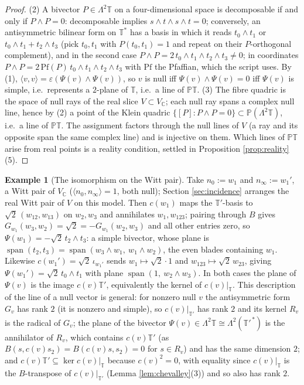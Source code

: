 \documentclass[11pt]{article}
\theoremstyle{definition}
\newtheorem{example}[theorem]{Example}
\newcommand{\C}{\mathbb{C}}
\newcommand{\T}{\mathbb{T}}
\newcommand{\PT}{\mathbb{PT}}
\newcommand{\nO}{n_0}
\newcommand{\nInf}{n_\infty}
\newcommand{\ip}[2]{\langle #1, #2\rangle}
\begin{document}
\begin{proof}
(2) A bivector $P \in \Lambda^2\T$ on a four-dimensional space is decomposable if and only if $P \wedge P = 0$: decomposable implies $s\wedge t\wedge s\wedge t = 0$; conversely, an antisymmetric bilinear form on $\T^*$ has a basis in which it reads $t_0\wedge t_1$ or $t_0\wedge t_1 + t_2\wedge t_3$ (pick $t_0, t_1$ with $P(t_0,t_1) = 1$ and repeat on their $P$-orthogonal complement), and in the second case $P\wedge P = 2\,t_0\wedge t_1\wedge t_2\wedge t_3 \neq 0$; in coordinates $P\wedge P = 2\,\mathrm{Pf}(P)\, t_0\wedge t_1\wedge t_2 \wedge t_3$ with $\mathrm{Pf}$ the Pfaffian, which the script uses. By (1), $\ip{v}{v} = \varepsilon(\Psi(v)\wedge\Psi(v))$, so $v$ is null iff $\Psi(v)\wedge\Psi(v) = 0$ iff $\Psi(v)$ is simple, i.e.\ represents a $2$-plane of $\T$, i.e.\ a line of $\PT$.
(3) The fibre quadric is the space of null rays of the real slice $V \subset V_\C$; each null ray spans a complex null line, hence by (2) a point of the Klein quadric $\{[P] : P\wedge P = 0\} \subset \mathbb{P}(\Lambda^2\T)$, i.e.\ a line of $\PT$. The assignment factors through the null lines of $V$ (a ray and its opposite span the same complex line) and is injective on them. Which lines of $\PT$ arise from real points is a reality condition, settled in Proposition \ref{prop:reality}(5).
\end{proof}

\begin{example}[The isomorphism on the Witt pair]\label{ex:psi}
Take $\nO := w_1$ and $\nInf := w_1'$, a Witt pair of $V_\C$ ($\ip{\nO}{\nInf} = 1$, both null); Section \ref{sec:incidence} arranges the real Witt pair of $V$ on this model. Then $c(w_1)$ maps the $\T'$-basis to $\sqrt2\,(w_{12}, w_{13})$ on $w_2, w_3$ and annihilates $w_1, w_{123}$; pairing through $B$ gives $G_{w_1}(w_3, w_2) = \sqrt2 = -G_{w_1}(w_2, w_3)$ and all other entries zero, so $\Psi(w_1) = -\sqrt2\,t_2\wedge t_3$: a simple bivector, whose plane is $\operatorname{span}(t_2, t_3) = \operatorname{span}(w_3\wedge w_1,\ w_1\wedge w_2)$, the even blades containing $w_1$. Likewise $c(w_1') = \sqrt2\,\iota_{w_1'}$ sends $w_1 \mapsto \sqrt2\cdot 1$ and $w_{123}\mapsto \sqrt2\,w_{23}$, giving $\Psi(w_1') = \sqrt2\,t_0\wedge t_1$ with plane $\operatorname{span}(1,\ w_2\wedge w_3)$. In both cases the plane of $\Psi(v)$ is the image $c(v)\T'$, equivalently the kernel of $c(v)|_\T$. This description of the line of a null vector is general: for nonzero null $v$ the antisymmetric form $G_v$ has rank $2$ (it is nonzero and simple), so $c(v)|_{\T'}$ has rank $2$ and its kernel $R_v$ is the radical of $G_v$; the plane of the bivector $\Psi(v) \in \Lambda^2\T \cong \Lambda^2(\T'^{\,*})$ is the annihilator of $R_v$, which contains $c(v)\T'$ (as $B(s, c(v)s_2) = B(c(v)s, s_2) = 0$ for $s \in R_v$) and has the same dimension $2$; and $c(v)\T' \subseteq \ker c(v)|_\T$ because $c(v)^2 = 0$, with equality since $c(v)|_\T$ is the $B$-transpose of $c(v)|_{\T'}$ (Lemma \ref{lem:chevalley}(3)) and so also has rank $2$.
\end{example}
\end{document}
